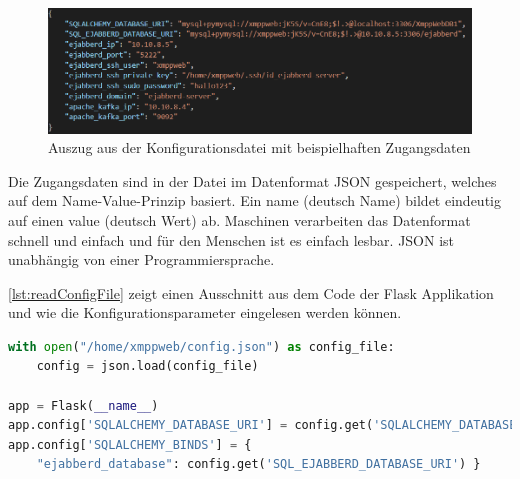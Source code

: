 \documentclass[a4paper,titlepage,halfparskip,12pt]{scrreprt}
\begin{document}
\begin{onehalfspacing}
\begin{figure}[h]
	\centering
	\includegraphics[width=\linewidth]{images/configJSON-Datei}
	\caption{Auszug aus der Konfigurationsdatei mit beispielhaften Zugangsdaten}
	\label{img:configJSON-Datei}
\end{figure}

Die Zugangsdaten sind in der Datei im Datenformat \ac{JSON} gespeichert, welches auf dem Name-Value-Prinzip basiert. Ein name (deutsch Name) bildet eindeutig auf einen value (deutsch Wert) ab. Maschinen verarbeiten das Datenformat schnell und einfach und für den Menschen ist es einfach lesbar. \ac{JSON} ist unabhängig von einer Programmiersprache.\cite{jsonIntroduction}

\autoref{lst:readConfigFile} zeigt einen Ausschnitt aus dem Code der Flask Applikation und wie die Konfigurationsparameter eingelesen werden können.

\begin{lstlisting}[language=python, caption={Auslesen der Konfigurationsparameter aus einer Datei}, label={lst:readConfigFile}]
with open("/home/xmppweb/config.json") as config_file:
    config = json.load(config_file)

app = Flask(__name__)
app.config['SQLALCHEMY_DATABASE_URI'] = config.get('SQLALCHEMY_DATABASE_URI')
app.config['SQLALCHEMY_BINDS'] = {
    "ejabberd_database": config.get('SQL_EJABBERD_DATABASE_URI') }
\end{lstlisting}


\end{onehalfspacing}
\end{document}
